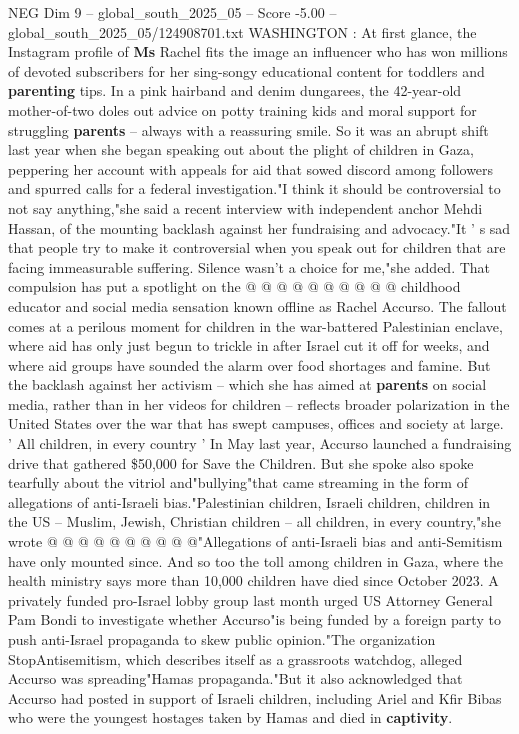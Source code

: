 \begin{textsample}{NEG Dim 9 – global\_south\_2025\_05 – Score -5.00 – global\_south\_2025\_05/124908701.txt}  \label{ex:f9_neg_225}
WASHINGTON : At first glance, the Instagram profile of \textbf{Ms} Rachel fits the image an influencer who has won millions of devoted subscribers for her sing-songy educational content for toddlers and \textbf{parenting} tips.
In a pink hairband and denim dungarees, the 42-year-old mother-of-two doles out advice on potty training kids and moral support for struggling \textbf{parents} -- always with a reassuring smile.
So it was an abrupt shift last year when she began speaking out about the plight of children in Gaza, peppering her account with appeals for aid that sowed discord among followers and spurred calls for a federal investigation."I think it should be controversial to not say anything,"she said a recent interview with independent anchor Mehdi Hassan, of the mounting backlash against her fundraising and advocacy."It ' s sad that people try to make it controversial when you speak out for children that are facing immeasurable suffering.
Silence wasn't a choice for me,"she added.
That compulsion has put a spotlight on the @ @ @ @ @ @ @ @ @ @ childhood educator and social media sensation known offline as Rachel Accurso.
The fallout comes at a perilous moment for children in the war-battered Palestinian enclave, where aid has only just begun to trickle in after Israel cut it off for weeks, and where aid groups have sounded the alarm over food shortages and famine.
But the backlash against her activism -- which she has aimed at \textbf{parents} on social media, rather than in her videos for children -- reflects broader polarization in the United States over the war that has swept campuses, offices and society at large. ' All children, in every country ' In May last year, Accurso launched a fundraising drive that gathered \$50,000 for Save the Children.
But she spoke also spoke tearfully about the vitriol and"bullying"that came streaming in the form of allegations of anti-Israeli bias."Palestinian children, Israeli children, children in the US -- Muslim, Jewish, Christian children -- all children, in every country,"she wrote @ @ @ @ @ @ @ @ @ @"Allegations of anti-Israeli bias and anti-Semitism have only mounted since.
And so too the toll among children in Gaza, where the health ministry says more than 10,000 children have died since October 2023.
A privately funded pro-Israel lobby group last month urged US Attorney General Pam Bondi to investigate whether Accurso"is being funded by a foreign party to push anti-Israel propaganda to skew public opinion."The organization StopAntisemitism, which describes itself as a grassroots watchdog, alleged Accurso was spreading"Hamas propaganda."But it also acknowledged that Accurso had posted in support of Israeli children, including Ariel and Kfir Bibas who were the youngest hostages taken by Hamas and died in \textbf{captivity}.

\end{textsample}
